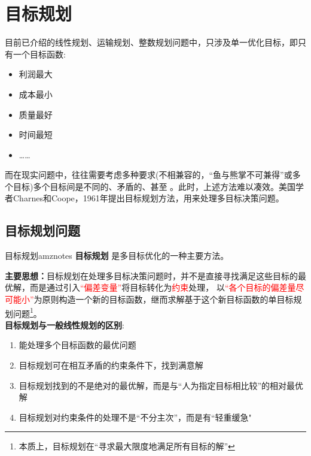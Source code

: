 \ifx\allfiles\undefined

	
	
\else
\fi
    \chapter{目标规划}
    目前已介绍的线性规划、运输规划、整数规划问题中，只涉及单一优化目标，即只有一个目标函数:
    \begin{itemize}
        \item 利润最大
        \item 成本最小
        \item 质量最好
        \item 时间最短
        \item ……
    \end{itemize}
而在现实问题中，往往需要考虑多种要求(不相兼容的，“鱼与熊掌不可兼得”或多个目标)多个目标间是不同的、矛盾的、甚至
。此时，上述方法难以凑效。美国学者Charnes和Coope，1961年提出目标规划方法，用来处理多目标决策问题。\\
    \section{目标规划问题}
    \begin{dfnbox}{目标规划}{amznotes}
        \textbf{目标规划} 是多目标优化的一种主要方法。
    \end{dfnbox}
    \textbf{主要思想：}目标规划在处理多目标决策问题时，并不是直接寻找满足这些目标的最优解，而是通过引入\textcolor{red}{“偏差变量”}将目标转化为\textcolor{red}{约束}处理，
    以\textcolor{red}{“各个目标的偏差量尽可能小”}为原则构造一个新的目标函数，继而求解基于这个新目标函数的单目标规划问题\footnote{本质上，目标规划在“寻求最大限度地满足所有目标的解”}。\\
    \textbf{目标规划与一般线性规划的区别}:
    \begin{enumerate}
        \item 能处理多个目标函数的最优问题
        \item 目标规划可在相互矛盾的约束条件下，找到满意解
        \item 目标规划找到的不是绝对的最优解，而是与“人为指定目标相比较”的相对最优解
        \item 目标规划对约束条件的处理不是“不分主次”，而是有“轻重缓急"
    \end{enumerate}
